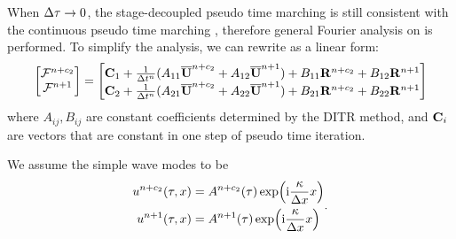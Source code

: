 When ${\Delta} \tau \rightarrow 0$, the stage-decoupled pseudo time marching
 is still consistent with the continuous
pseudo time marching , therefore
general Fourier analysis on  is performed.
To simplify the analysis, we can rewrite 
as a linear form:
\begin{equation}
    \begin{bmatrix}
        \mathcal{F}^{n+c_2} \\
        \mathcal{F}^{n+1}
    \end{bmatrix}
    =
    \begin{bmatrix}
        \mathbf{C}_1 + \frac{1}{{\Delta} t^n}(A_{11}\overline{\mathbf{U}}^{n+c_2} + A_{12}\overline{\mathbf{U}}^{n+1})
        + B_{11}\mathbf{R}^{n+c_2} + B_{12}\mathbf{R}^{n+1} \\
        \mathbf{C}_2 + \frac{1}{{\Delta} t^n}(A_{21}\overline{\mathbf{U}}^{n+c_2} + A_{22}\overline{\mathbf{U}}^{n+1})
        + B_{21}\mathbf{R}^{n+c_2} + B_{22}\mathbf{R}^{n+1}
    \end{bmatrix}
    \label{eq:linearDITRFF}
\end{equation}
where $A_{ij},B_{ij}$ are constant coefficients
determined by the DITR method, and $\mathbf{C}_i$ are
vectors that are constant in one step of pseudo time iteration.

We assume the simple wave modes to be
\begin{equation}
    \begin{aligned}
        u^{n+c_2}(\tau,x) & = A^{n+c_2}(\tau)\exp(\mathrm{i} \frac{\kappa}{{\Delta} x} x) \\
        u^{n+1}(\tau,x)   & = A^{n+1}(\tau)\exp(\mathrm{i} \frac{\kappa}{{\Delta} x} x)
    \end{aligned}.
\end{equation}

